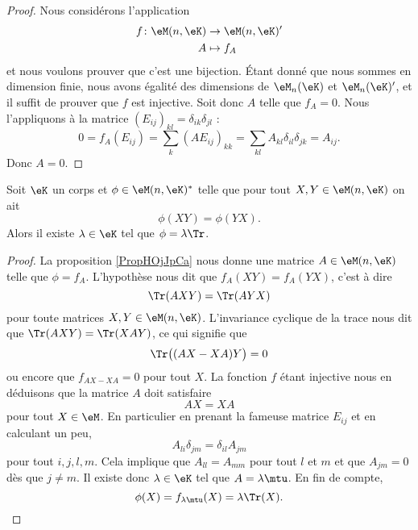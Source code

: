 \begin{proof}
    Nous considérons l'application
    \begin{equation}
        \begin{aligned}
            f\colon \eM(n,\eK)&\to \eM(n,\eK)' \\
            A&\mapsto f_A 
        \end{aligned}
    \end{equation}
    et nous voulons prouver que c'est une bijection. Étant donné que nous sommes en dimension finie, nous avons égalité des dimensions de \( \eM_n(\eK)\) et \( \eM_n(\eK)'\), et il suffit de prouver que \( f\) est injective. Soit donc \( A\) telle que \( f_A=0\). Nous l'appliquons à la matrice \( (E_{ij})_{kl}=\delta_{ik}\delta_{jl}\) :
    \begin{equation}
            0=f_A(E_{ij})
            =\sum_{k}(AE_{ij})_{kk}
            =\sum_{kl}A_{kl}\delta_{il}\delta_{jk}
            =A_{ij}.
    \end{equation}
    Donc \( A=0\).
\end{proof}

\begin{corollary}
    Soit \( \eK\) un corps et \( \phi\in\eM(n,\eK)^*\) telle que pour tout \( X,Y\in \eM(n,\eK)\) on ait
    \begin{equation}
        \phi(XY)=\phi(YX).
    \end{equation}
    Alors il existe \( \lambda\in \eK\) tel que \( \phi=\lambda\Tr\).
\end{corollary}

\begin{proof}
    La proposition \ref{PropHOjJpCa} nous donne une matrice \( A\in \eM(n,\eK)\) telle que \( \phi=f_A\). L'hypothèse nous dit que \( f_A(XY)=f_A(YX)\), c'est à dire
    \begin{equation}
        \Tr(AXY)=\Tr(AYX)
    \end{equation}
    pour toute matrices \( X,Y\in \eM(n,\eK)\). L'invariance cyclique de la trace nous dit que \( \Tr(AXY)=\Tr(XAY)\), ce qui signifie que
    \begin{equation}
        \Tr\big( (AX-XA)Y \big)=0
    \end{equation}
    ou encore que \( f_{AX-XA}=0\) pour tout \( X\). La fonction \( f\) étant injective nous en déduisons que la matrice \( A\) doit satisfaire
    \begin{equation}
        AX=XA
    \end{equation}
    pour tout \( X\in\eM\). En particulier en prenant la fameuse matrice \( E_{ij}\) et en calculant un peu,
    \begin{equation}
        A_{li}\delta_{jm}=\delta_{il}A_{jm}
    \end{equation}
    pour tout \( i,j,l,m\). Cela implique que \( A_{ll}=A_{mm}\) pour tout \( l\) et \( m\) et que \( A_{jm}=0\) dès que \( j\neq m\). Il existe donc \( \lambda\in \eK\) tel que \( A=\lambda\mtu\). En fin de compte,
    \begin{equation}
        \phi(X)=f_{\lambda\mtu}(X)=\lambda\Tr(X).
    \end{equation}
\end{proof}

